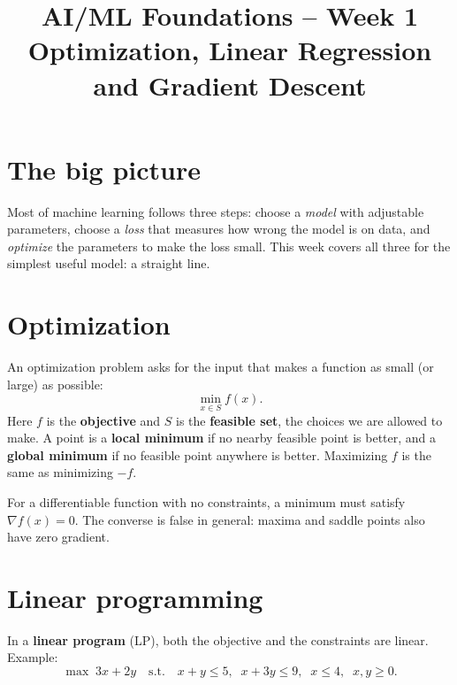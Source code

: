 \documentclass[11pt,a4paper]{article}
\title{AI/ML Foundations -- Week 1\\ \large Optimization, Linear Regression and Gradient Descent}
\author{}\date{}
\begin{document}
\maketitle

\section{The big picture}
Most of machine learning follows three steps: choose a \emph{model} with adjustable parameters, choose a \emph{loss} that measures how wrong the model is on data, and \emph{optimize} the parameters to make the loss small. This week covers all three for the simplest useful model: a straight line.

\section{Optimization}
An optimization problem asks for the input that makes a function as small (or large) as possible:
\[ \min_{x \in S} f(x). \]
Here $f$ is the \textbf{objective} and $S$ is the \textbf{feasible set}, the choices we are allowed to make. A point is a \textbf{local minimum} if no nearby feasible point is better, and a \textbf{global minimum} if no feasible point anywhere is better. Maximizing $f$ is the same as minimizing $-f$.

For a differentiable function with no constraints, a minimum must satisfy $\nabla f(x) = 0$. The converse is false in general: maxima and saddle points also have zero gradient.

\section{Linear programming}
In a \textbf{linear program} (LP), both the objective and the constraints are linear. Example:
\[ \max\; 3x + 2y \quad \text{s.t.}\quad x + y \le 5,\;\; x + 3y \le 9,\;\; x \le 4,\;\; x, y \ge 0. \]

\begin{center}
\end{center}
\end{document}
